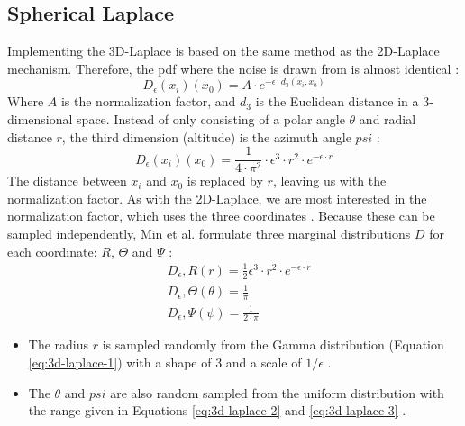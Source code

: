 \subsection{Spherical Laplace}
Implementing the 3D-Laplace is based on the same method as the 2D-Laplace mechanism.
Therefore, the \gls{pdf} where the noise is drawn from is almost identical \citep{9646489}:
\begin{equation}
  D_{\epsilon}(x_i)(x_0) = A \cdot e^{-\epsilon \cdot d_3(x_i, x_0)}
  \label{eq:3d-laplace-pdf}
\end{equation}
Where $A$ is the normalization factor, and $d_3$ is the Euclidean distance in a 3-dimensional space.
Instead of only consisting of a polar angle $\theta$ and radial distance $r$, the third dimension (altitude) is the azimuth angle $psi$ \citep{9646489}:
\begin{equation}
  D_{\epsilon}(x_i)(x_0) = \frac{1}{4 \cdot \pi^2} \cdot \epsilon^3 \cdot r^2 \cdot e^{-\epsilon \cdot r}
  \label{eq:3d-laplace-with-normalization}
\end{equation}
The distance between $x_i$ and $x_0$ is replaced by $r$, leaving us with the normalization factor.
As with the 2D-Laplace, we are most interested in the normalization factor, which uses the three coordinates \citep{9646489}.
Because these can be sampled independently, Min et al. formulate three marginal distributions $D$ for each coordinate: $R$, $\Theta$ and $\Psi$ \citep{9646489}:
\begin{subequations}

  \begin{align}
     & D_\epsilon, R(r) = \frac{1}{2} \epsilon^3 \cdot r^2 \cdot e^{-\epsilon \cdot r} \label{eq:3d-laplace-1} \\
     & D_\epsilon, \Theta(\theta) = \frac{1}{\pi}                                      \label{eq:3d-laplace-2} \\
     & D_\epsilon, \Psi(\psi) = \frac{1}{2 \cdot \pi} \label{eq:3d-laplace-3}
  \end{align}
\end{subequations}
\begin{itemize}
  \item The radius $r$ is sampled randomly from the Gamma distribution (Equation \ref{eq:3d-laplace-1}) with a shape of 3 and a scale of $1/\epsilon$ \citep{9646489}.
  \item The $\theta$ and $psi$ are also random sampled from the uniform distribution with the range given in Equations \ref{eq:3d-laplace-2} and \ref{eq:3d-laplace-3} \citep{9646489}.
\end{itemize}
